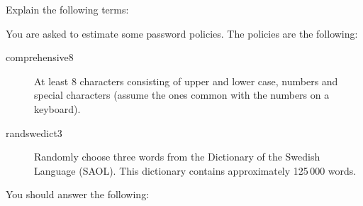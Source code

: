\documentclass[a4paper,addpoints]{exam}
\begin{document}
\begin{questions}
  \question\label{q:passwd:auth:E}
  Explain the following terms:




  \question\label{q:passwd:infotheory:E:C:A}
  You are asked to estimate some password policies.
  The policies are the following:
  \begin{description}
    \item[comprehensive8]
      At least 8 characters consisting of upper and lower case, numbers and 
      special characters (assume the ones common with the numbers on 
      a keyboard).
    \item[randswedict3]
      Randomly choose three words from the Dictionary of the Swedish Language 
      (SAOL).
      This dictionary contains approximately 125\,000 words.
  \end{description}
  You should answer the following:
  \begin{parts}

\end{parts}
\end{questions}
\end{document}
